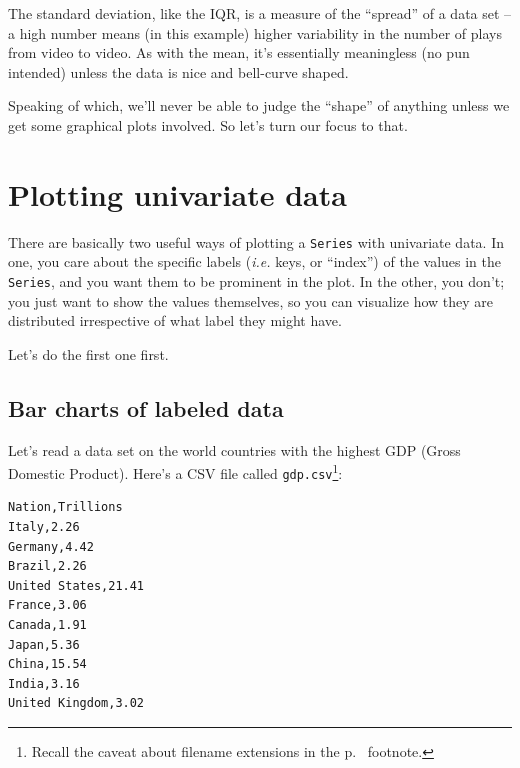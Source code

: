 
The standard deviation, like the IQR, is a measure of the ``spread'' of a data
set -- a high number means (in this example) higher variability in the number
of plays from video to video. As with the mean, it's essentially meaningless
(no pun intended) unless the data is nice and bell-curve shaped.

Speaking of which, we'll never be able to judge the ``shape'' of anything
unless we get some graphical plots involved. So let's turn our focus to that.

\section{Plotting univariate data}

\label{twoWaysToPlotUnivariateData}

There are basically two useful ways of plotting a \texttt{Series} with
univariate data. In one, you care about the specific labels (\textit{i.e.}
keys, or ``index'') of the values in the \texttt{Series}, and you want them to
be prominent in the plot. In the other, you don't; you just want to show the
values themselves, so you can visualize how they are distributed irrespective
of what label they might have.

Let's do the first one first.

\subsection{Bar charts of labeled data}


Let's read a data set on the world countries with the highest GDP (Gross
Domestic Product). Here's a CSV file called \texttt{gdp.csv}\footnote{Recall
the caveat about filename extensions in the p.~\pageref{extensions} footnote.}:

\begin{Verbatim}[fontsize=\small,samepage=true,frame=single,framesep=3mm]
Nation,Trillions
Italy,2.26
Germany,4.42
Brazil,2.26
United States,21.41
France,3.06
Canada,1.91
Japan,5.36
China,15.54
India,3.16
United Kingdom,3.02
\end{Verbatim}


